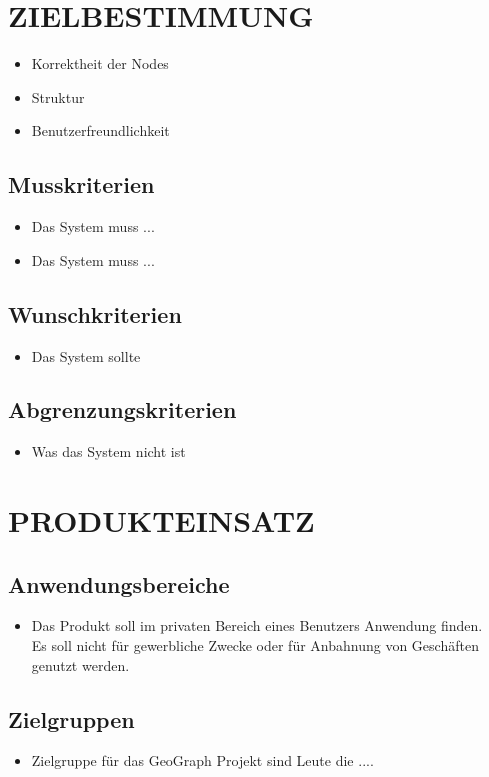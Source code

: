 \newpage
	\section{\Large ZIELBESTIMMUNG}
	\begin{itemize}
		\item Korrektheit der Nodes
		\item Struktur
		\item Benutzerfreundlichkeit
	\end{itemize}
	\subsection{Musskriterien}
	\begin{itemize}
		\item Das System muss ...
		\item Das System muss ...
	\end{itemize}
	\subsection{Wunschkriterien}
	\begin{itemize}
		\item Das System sollte
	\end{itemize}
	\subsection{Abgrenzungskriterien}
	\begin{itemize}
		\item Was das System nicht ist
	\end{itemize}
	
	\section{\Large PRODUKTEINSATZ}
	\subsection{Anwendungsbereiche}
	\begin{itemize}
		\item Das Produkt soll im privaten Bereich eines Benutzers Anwendung finden.\\
		Es soll nicht für gewerbliche Zwecke oder für Anbahnung von Geschäften genutzt werden.
	\end{itemize}
	\subsection{Zielgruppen}
	\begin{itemize}
		\item Zielgruppe für das GeoGraph Projekt sind Leute die ....
	\end{itemize}
